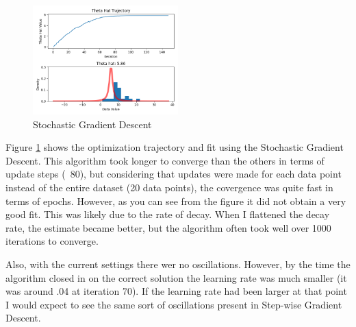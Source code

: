 \begin{figure}[ht]
    \centering
    \includegraphics[width=0.5\textwidth]{figs/cauchy_sgd.png}
    \caption{Stochastic Gradient Descent}
    \label{fig:cauchy_sgd}
\end{figure}



Figure \ref{fig:cauchy_sgd} shows the optimization trajectory and fit using the Stochastic Gradient Descent. 
This algorithm took longer to converge than the others in terms of update steps (~80), but considering that updates were made for each data point instead of the entire dataset (20 data points), the covergence was quite fast in terms of epochs.
However, as you can see from the figure it did not obtain a very good fit.
This was likely due to the rate of decay. 
When I flattened the decay rate, the estimate became better, but the algorithm often took well over 1000 iterations to converge.

Also, with the current settings there wer no oscillations.
However, by the time the algorithm closed in on the correct solution the learning rate was much smaller (it was around .04 at iteration 70).
If the learning rate had been larger at that point I would expect to see the same sort of oscillations present in Step-wise Gradient Descent.


